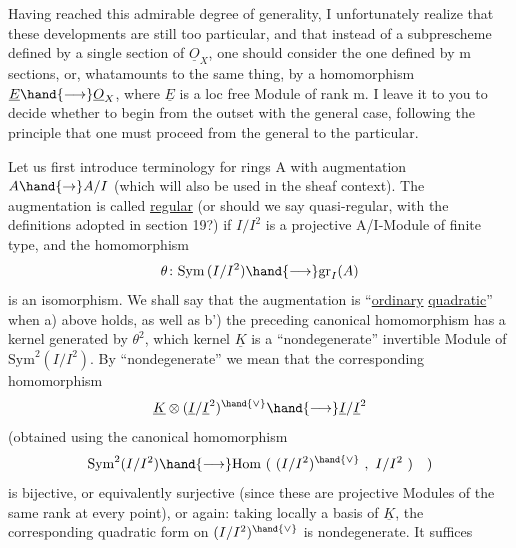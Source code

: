 
Having reached this admirable degree of generality, I unfortunately
realize that these developments are still too particular, and that instead
of a subprescheme defined by a single section of $\underline{O}_X$, one should
consider the one defined by m sections, or, what\hand{/}amounts to the same thing, by a
homomorphism $\underline{E} \hand{\longrightarrow} \underline{O}_X$, where $\underline{E}$ is a loc free Module of rank m. I
leave it to you to decide whether to begin from the outset with the
general case, following the principle that one must proceed from the general to the
particular.

Let us first introduce terminology for rings A with
augmentation $A \hand{\to} A/I$ (which will also be used in the sheaf
context). The augmentation is called \uline{regular} (or should we say
quasi-regular, with the definitions adopted in section 19?) if  $I/I^2$ is
a projective A/I-Module of finite type, and  the homomorphism
\[ \theta\colon \mathrm{Sym}\,(I/I^2) \hand{\longrightarrow} \mathrm{gr}_I(A) \]
is an isomorphism. We shall say that the augmentation is  ``\uline{ordinary}
\uline{quadratic}'' when a) above holds, as well as b') the preceding canonical
homomorphism has a kernel generated by $\theta^2$, which kernel $\underline{K}$
is a ``nondegenerate'' invertible Module of $\mathrm{Sym}^2(I/I^2)$. By ``nondegenerate''
we mean that the corresponding homomorphism
\[ \underline{K} \otimes (\underline{I}/\underline{I}^2)^{\hand{\vee}} \hand{\longrightarrow} \underline{I}/\underline{I}^2 \]
(obtained using the canonical homomorphism
\[ \mathrm{Sym}^2(I/I^2) \hand{\longrightarrow} \mathrm{Hom}\ (\ (I/I^2)^{\hand{\vee}}\ ,\ I/I^2\ )\quad ) \]
is bijective, or equivalently surjective (since these are
projective Modules  of the same rank at every point), or again: taking
locally a basis  of $\underline{K}$,  the corresponding
quadratic form on $(I/I^2)^{\hand{\vee}}$ is nondegenerate. It suffices

